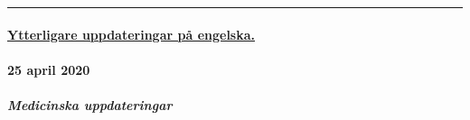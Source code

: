 \begin{center}\rule{0.5\linewidth}{\linethickness}\end{center}

\hypertarget{ytterligare-uppdateringar-puxe5-engelska}{%
\paragraph{\texorpdfstring{\href{https://swprs.org/a-swiss-doctor-on-covid-19/}{Ytterligare
uppdateringar på
engelska.}}{Ytterligare uppdateringar på engelska.}}\label{ytterligare-uppdateringar-puxe5-engelska}}

\hypertarget{25-april-2020}{%
\paragraph{25 april 2020}\label{25-april-2020}}

\hypertarget{medicinska-uppdateringar}{%
\subparagraph{\texorpdfstring{\textbf{Medicinska
uppdateringar}}{Medicinska uppdateringar}}\label{medicinska-uppdateringar}}

